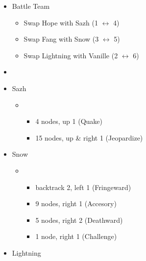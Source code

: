 \begin{menu}
	\begin{itemize}
		\paradigm
		\begin{itemize}
			\item Battle Team
				\begin{itemize}
					\item Swap Hope with Sazh (1 $\leftrightarrow$ 4)
				    \item Swap Fang with Snow (3 $\leftrightarrow$ 5)
				    \item Swap Lightning with Vanille (2 $\leftrightarrow$ 6)
			    \end{itemize}
			\item {}%
			      {\paradigmline{\com}{\med}{\sen}}%
			      {\paradigmline{\com}{\rav}{(\sen)}}%
			      {\paradigmline[4]{\syn}{(\rav)}{\sen}}%
			      {\paradigmline{[\syn]}{\sab}{\com}}%
			      {\paradigmline{[\com]}{\sab}{\com}}%
			      {\paradigmline{[\com]}{\sab}{(\sen)}}
		\end{itemize}
		\crystarium
		\begin{itemize}
			\item Sazh
				\begin{itemize}
					\item \com
				    	\begin{itemize}
					    	\item 4 nodes, up 1 (Quake)
							\item 15 nodes, up \& right 1 (Jeopardize)
				        \end{itemize}
			    \end{itemize}
			\item Snow
				\begin{itemize}
					\item \sen
				    	\begin{itemize}
					    	\item backtrack 2, left 1 (Fringeward)
					        \item 9 nodes, right 1 (Accesory)
					        \item 5 nodes, right 2 (Deathward)
					        \item 1 node, right 1 (Challenge)
				        \end{itemize}
			    \end{itemize}
		\end{itemize}
		\equip
		\begin{itemize}
			\item Lightning

\end{itemize}
\end{itemize}
\end{menu}
